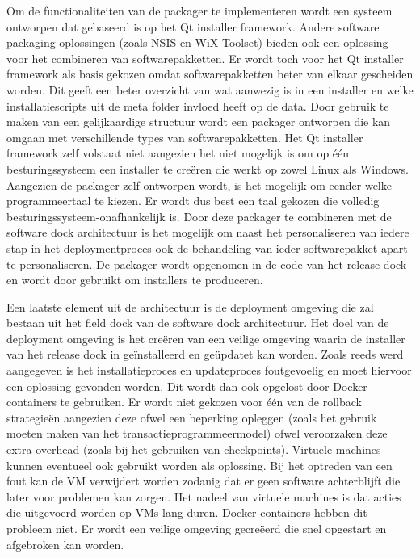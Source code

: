 Om de functionaliteiten van de packager te implementeren wordt een systeem ontworpen dat gebaseerd is op het Qt installer framework.
Andere software packaging oplossingen (zoals NSIS en WiX Toolset) bieden ook een oplossing voor het combineren van softwarepakketten.
Er wordt toch voor het Qt installer framework als basis gekozen omdat softwarepakketten beter van elkaar gescheiden worden.
Dit geeft een beter overzicht van wat aanwezig is in een installer en welke installatiescripts uit de meta folder invloed heeft op de data.
Door gebruik te maken van een gelijkaardige structuur wordt een packager ontworpen die kan omgaan met verschillende types van softwarepakketten.
Het Qt installer framework zelf volstaat niet aangezien het niet mogelijk is om op één besturingssysteem een installer te creëren die werkt op zowel Linux als Windows.
Aangezien de packager zelf ontworpen wordt, is het mogelijk om eender welke programmeertaal te kiezen.
Er wordt dus best een taal gekozen die volledig besturingssysteem-onafhankelijk is.
Door deze packager te combineren met de software dock architectuur is het mogelijk om naast het personaliseren van iedere stap in het deploymentproces ook de behandeling van ieder softwarepakket apart te personaliseren.
De packager wordt opgenomen in de code van het release dock en wordt door gebruikt om installers te produceren.

Een laatste element uit de architectuur is de deployment omgeving die zal bestaan uit het field dock van de software dock architectuur.
Het doel van de deployment omgeving is het creëren van een veilige omgeving waarin de installer van het release dock in geïnstalleerd en geüpdatet kan worden.
Zoals reeds werd aangegeven is het installatieproces en updateproces foutgevoelig en moet hiervoor een oplossing gevonden worden.
Dit wordt dan ook opgelost door Docker containers te gebruiken.
Er wordt niet gekozen voor één van de rollback strategieën aangezien deze ofwel een beperking opleggen (zoals het gebruik moeten maken van het transactieprogrammeermodel) ofwel veroorzaken deze extra overhead (zoals bij het gebruiken van checkpoints).
Virtuele machines kunnen eventueel ook gebruikt worden als oplossing.
Bij het optreden van een fout kan de VM verwijdert worden zodanig dat er geen software achterblijft die later voor problemen kan zorgen.
Het nadeel van virtuele machines is dat acties die uitgevoerd worden op VMs lang duren.
Docker containers hebben dit probleem niet.
Er wordt een veilige omgeving gecreëerd die snel opgestart en afgebroken kan worden.


